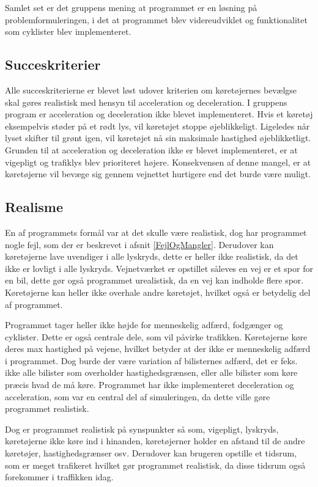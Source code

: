 \vspace{5mm}
Samlet set er det gruppens mening at programmet er en løsning på problemformuleringen, i det at programmet blev videreudviklet og funktionalitet som cyklister blev implementeret.

\subsection{Succeskriterier}
Alle succeskriterierne er blevet løst udover kriterien om køretøjernes bevælgse skal gøres realistisk med hensyn til acceleration og deceleration. I gruppens program er acceleration og deceleration ikke blevet implementeret. Hvis et køretøj eksempelvis støder på et rødt lys, vil køretøjet stoppe øjeblikkeligt. Ligeledes når lyset skifter til grønt igen, vil køretøjet nå sin maksimale hastighed øjeblikketligt. Grunden til at acceleration og deceleration ikke er blevet implementeret, er at vigepligt og trafiklys blev prioriteret højere. Konsekvensen af denne mangel, er at køretøjerne vil bevæge sig gennem vejnettet hurtigere end det burde være muligt.

\subsection{Realisme}
En af programmets formål var at det skulle være realistisk, dog har programmet nogle fejl, som der er beskrevet i afsnit \ref{FejlOgMangler}.  Derudover kan køretøjerne lave uvendiger i alle lyskryds, dette er heller ikke realistisk, da det ikke er lovligt i alle lyskryds. Vejnetværket er opstillet såleves en vej er et spor for en bil, dette gør også programmet urealistisk, da en vej kan indholde flere spor. Køretøjerne kan heller ikke overhale andre køretøjet, hvilket også er betydelig del af programmet. 

\vspace{5mm}
Programmet tager heller ikke højde for menneskelig adfærd, fodgænger og cyklister. Dette er også centrale dele, som vil påvirke trafikken. Køretøjerne køre deres max hastighed på vejene, hvilket betyder at der ikke er menneskelig adfærd i programmet. Dog burde der være variation af bilisternes adfærd, det er feks. ikke alle bilister som overholder hastighedsgrænsen, eller alle bilister som køre præcis hvad de må køre. Programmet har ikke implementeret deceleration og acceleration, som var en central del af simuleringen, da dette ville gøre programmet realistisk.

\vspace{5mm}
Dog er programmet realistisk på synspunkter så som, vigepligt, lyskryds, køretøjerne ikke køre ind i hinanden, køretøjerner holder en afstand til de andre køretøjer, hastighedsgrænser osv. Derudover kan brugeren opstille et tidsrum, som er meget trafikeret hvilket gør programmet realistisk, da disse tidsrum også forekommer i traffikken idag. 